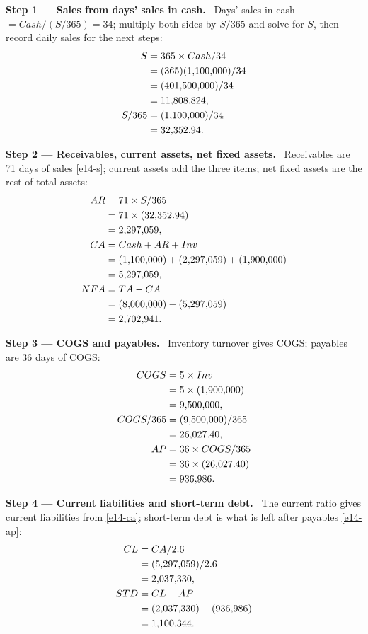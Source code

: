 \documentclass[11pt,a4paper]{article}
\newcommand{\step}[2]{\par\medskip\noindent\textbf{Step #1 --- #2.}~}
\begin{document}
\step{1}{Sales from days' sales in cash}
Days' sales in cash $= Cash/(S/365) = 34$; multiply both sides by $S/365$ and solve for $S$, then
record daily sales for the next steps:
\begin{align}
  S &= 365 \times Cash/34 \notag\\
  &= (365)(1{,}100{,}000)/34 \notag\\
  &= (401{,}500{,}000)/34 \notag\\
  &= 11{,}808{,}824, \label{e14-s}\\
  S/365 &= (1{,}100{,}000)/34 \notag\\
  &= 32{,}352.94. \notag
\end{align}

\step{2}{Receivables, current assets, net fixed assets}
Receivables are 71 days of sales \eqref{e14-s}; current assets add the three items; net fixed
assets are the rest of total assets:
\begin{align}
  AR &= 71 \times S/365 \notag\\
  &= 71 \times (32{,}352.94) \notag\\
  &= 2{,}297{,}059, \label{e14-ar}\\
  CA &= Cash + AR + Inv \notag\\
  &= (1{,}100{,}000) + (2{,}297{,}059) + (1{,}900{,}000) \notag\\
  &= 5{,}297{,}059, \label{e14-ca}\\
  NFA &= TA - CA \notag\\
  &= (8{,}000{,}000) - (5{,}297{,}059) \notag\\
  &= 2{,}702{,}941. \notag
\end{align}

\step{3}{COGS and payables}
Inventory turnover gives COGS; payables are 36 days of COGS:
\begin{align}
  COGS &= 5 \times Inv \notag\\
  &= 5 \times (1{,}900{,}000) \notag\\
  &= 9{,}500{,}000, \label{e14-cogs}\\
  COGS/365 &= (9{,}500{,}000)/365 \notag\\
  &= 26{,}027.40, \notag\\
  AP &= 36 \times COGS/365 \notag\\
  &= 36 \times (26{,}027.40) \notag\\
  &= 936{,}986. \label{e14-ap}
\end{align}

\step{4}{Current liabilities and short-term debt}
The current ratio gives current liabilities from \eqref{e14-ca}; short-term debt is what is left
after payables \eqref{e14-ap}:
\begin{align}
  CL &= CA/2.6 \notag\\
  &= (5{,}297{,}059)/2.6 \notag\\
  &= 2{,}037{,}330, \label{e14-cl}\\
  STD &= CL - AP \notag\\
  &= (2{,}037{,}330) - (936{,}986) \notag\\
  &= 1{,}100{,}344. \notag
\end{align}
\end{document}
